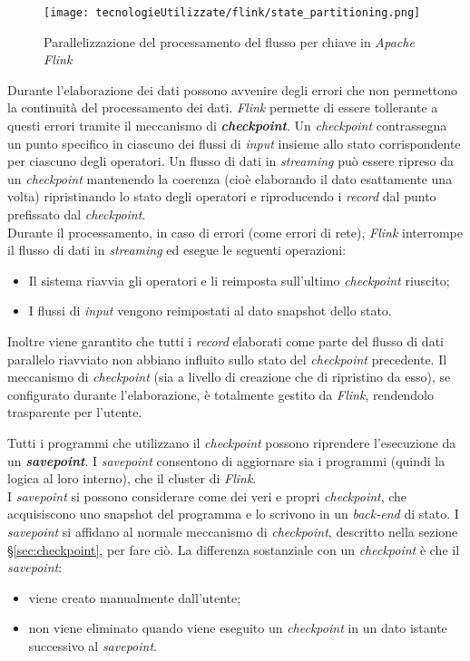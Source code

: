 \begin{figure}[H] 
    \centering 
    \texttt{[image: tecnologieUtilizzate/flink/state\_partitioning.png]} 
    \caption{Parallelizzazione del processamento del flusso per chiave in \textit{Apache Flink}}
\end{figure}

\label{sec:checkpoint}
Durante l'elaborazione dei dati possono avvenire degli errori che non permettono la continuità del processamento dei dati. \textit{Flink} permette di essere tollerante a questi errori tramite il meccanismo di \textbf{\textit{checkpoint}}. Un \textit{checkpoint} contrassegna un punto specifico in ciascuno dei flussi di \textit{input} insieme allo stato corrispondente per ciascuno degli operatori. Un flusso di dati in \textit{streaming} può essere ripreso da un \textit{checkpoint} mantenendo la coerenza (cioè elaborando il dato esattamente una volta) ripristinando lo stato degli operatori e riproducendo i \textit{record} dal punto prefissato dal \textit{checkpoint}.\\
Durante il processamento, in caso di errori (come errori di rete), \textit{Flink} interrompe il flusso di dati in \textit{streaming} ed esegue le seguenti operazioni:
\begin{itemize}
	\item{Il sistema riavvia gli operatori e li reimposta sull'ultimo \textit{checkpoint} riuscito;}
	\item{I flussi di \textit{input} vengono reimpostati al dato \gls{snapshot} dello stato.}
\end{itemize}
Inoltre viene garantito che tutti i \textit{record} elaborati come parte del flusso di dati parallelo riavviato non abbiano influito sullo stato del \textit{checkpoint} precedente.
Il meccanismo di \textit{checkpoint} (sia a livello di creazione che di ripristino da esso), se configurato durante l'elaborazione, è totalmente gestito da \textit{Flink}, rendendolo trasparente per l'utente.

Tutti i programmi che utilizzano il \textit{checkpoint} possono riprendere l'esecuzione da un \textbf{\textit{savepoint}}. I \textit{savepoint} consentono di aggiornare sia i programmi (quindi la logica al loro interno), che il \gls{cluster} di \textit{Flink}.\\
I \textit{savepoint} si possono considerare come dei veri e propri \textit{checkpoint}, che acquisiscono uno \gls{snapshot} del programma e lo scrivono in un \textit{back-end} di stato. I \textit{savepoint} si affidano al normale meccanismo di \textit{checkpoint}, descritto nella sezione \S\ref{sec:checkpoint}, per fare ciò. La differenza sostanziale con un \textit{checkpoint} è che il \textit{savepoint}:
\begin{itemize}
	\item{viene creato manualmente dall'utente;}
	\item{non viene eliminato quando viene eseguito un \textit{checkpoint} in un dato istante successivo al \textit{savepoint}.}
\end{itemize}


